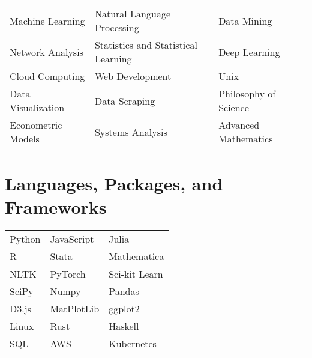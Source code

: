 \documentclass[10pt,a4paper,sans]{moderncv}
\begin{document}
\def\arraystretch{0}
\raggedleft
\begin{tabularx}{.9\textwidth}{>{\center\arraybackslash}X >{\center\arraybackslash}X >{\center\arraybackslash}X}
	Machine Learning & Natural Language Processing & Data Mining \\
	Network Analysis & Statistics and Statistical Learning & Deep Learning \\
	Cloud Computing & Web Development & Unix \\
	Data Visualization & Data Scraping & Philosophy of Science \\
	Econometric Models & Systems Analysis & Advanced Mathematics
\end{tabularx}

\section{Languages, Packages, and Frameworks}
\def\arraystretch{0}
\raggedleft
\begin{tabularx}{.9\textwidth}{>{\center\arraybackslash}X >{\center\arraybackslash}X >{\center\arraybackslash}X}
Python & JavaScript & Julia \\
R & Stata & Mathematica \\
NLTK & PyTorch & Sci-kit Learn \\
SciPy & Numpy & Pandas \\
D3.js & MatPlotLib & ggplot2 \\
Linux & Rust & Haskell \\
  SQL & AWS & Kubernetes \\

\end{tabularx}
\end{document}
